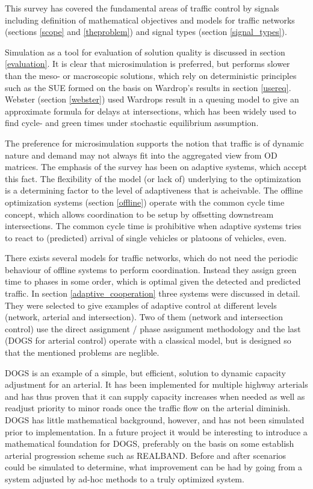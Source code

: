 \label{conclusion}
This survey has covered the fundamental areas of traffic control by signals including definition of mathematical objectives and models for traffic networks (sections \ref{scope} and \ref{theproblem}) and signal types (section \ref{signal_types}). 

Simulation as a tool for evaluation of solution quality is discussed in section \ref{evaluation}. It is clear that microsimulation is preferred, but performs slower than the meso- or macroscopic solutions, which rely on deterministic principles such as the SUE formed on the basis on Wardrop's results in section \ref{usereq}. Webster (section \ref{webster}) used Wardrops result in a queuing model to give an approximate formula for delays at intersections, which has been widely used to find cycle- and green times under stochastic equilibrium assumption.

The preference for microsimulation supports the notion that traffic is of dynamic nature and demand may not always fit into the aggregated view from OD matrices. The emphasis of the survey has been on adaptive systems, which accept this fact. 
The flexibility of the model (or lack of) underlying to the optimization is a determining factor to the level of adaptiveness that is acheivable. The offline optimization systems (section \ref{offline}) operate with the common cycle time concept, which allows coordination to be setup by offsetting downstream intersections. The common cycle time is prohibitive when adaptive systems tries to react to (predicted) arrival of single vehicles or platoons of vehicles, even.

There exists several models for traffic networks, which do not need the periodic behaviour of offline systems to perform coordination. Instead they assign green time to phases in some order, which is optimal given the detected and predicted traffic. 
In section \ref{adaptive_cooperation} three systems were discussed in detail. They were selected to give examples of adaptive control at different levels (network, arterial and intersection). Two of them (network and intersection control) use the direct assignment / phase assignment methodology and the last (DOGS for arterial control) operate with a classical model, but is designed so that the mentioned problems are neglible.

DOGS is an example of a simple, but efficient, solution to dynamic capacity adjustment for an arterial. It has been implemented for multiple highway arterials and has thus proven that it can supply capacity increases when needed as well as readjust priority to minor roads once the traffic flow on the arterial diminish.
DOGS has little mathematical background, however, and has not been simulated prior to implementation. 
In a future project it would be interesting to introduce a mathematical foundation for DOGS, preferably on the basis on some establish arterial progression scheme such as REALBAND. Before and after scenarios could be simulated to determine, what improvement can be had by going from a system adjusted by ad-hoc methods to a truly optimized system.
